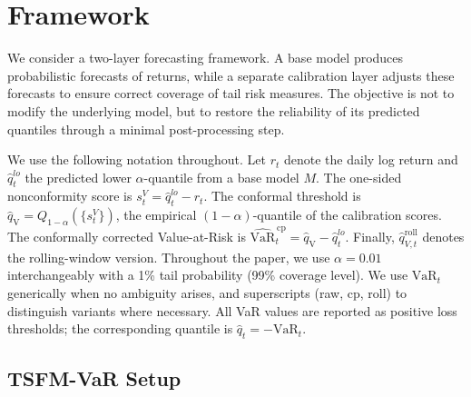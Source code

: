 \documentclass[preprint,11pt,authoryear]{elsarticle}
\newcommand{\VaR}{\mathrm{VaR}}
\newcommand{\1}{\boldsymbol{1}}
\newcommand{\qV}{\hat{q}_{\scriptscriptstyle\mathrm{V}}}
\begin{document}
	\section{Framework}
	\label{sec:framework}
	
	We consider a two-layer forecasting framework. A base model
	produces probabilistic forecasts of returns, while a separate
	calibration layer adjusts these forecasts to ensure correct
	coverage of tail risk measures. The objective is not to modify
	the underlying model, but to restore the reliability of its
	predicted quantiles through a minimal post-processing step.
	
	We use the following notation throughout. Let $r_t$ denote the
	daily log return and $\hat{q}_t^{lo}$ the predicted lower
	$\alpha$-quantile from a base model $M$. The one-sided
	nonconformity score is $s_t^{V} = \hat{q}_t^{lo} - r_t$. The
	conformal threshold is
	$\qV = Q_{1-\alpha}(\{s_t^{V}\})$, the empirical
	$(1-\alpha)$-quantile of the calibration scores. The
	conformally corrected Value-at-Risk is
	$\widehat{\VaR}_t^{\,\mathrm{cp}} = \qV - \hat{q}_t^{lo}$.
	Finally, $\hat{q}_{V,t}^{\mathrm{roll}}$ denotes the
	rolling-window version.
	Throughout the paper, we use $\alpha = 0.01$ interchangeably with a 1\% tail probability (99\% coverage level).
	We use $\VaR_t$ generically when no ambiguity arises, and superscripts (raw, cp, roll) to distinguish variants where necessary. All VaR values are reported as positive loss thresholds; the corresponding quantile is $\hat{q}_t = -\VaR_t$.

	\subsection{TSFM-VaR Setup}
	\label{sec:setup}
	
\end{document}
